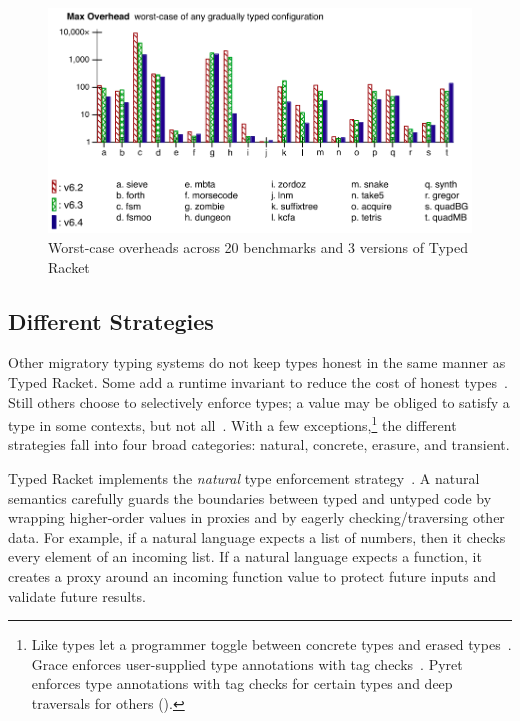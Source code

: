 \begin{figure}[h]
  \includegraphics[width=0.8\columnwidth]{src/jfp-2019-max.png}
  \caption{Worst-case overheads across 20 benchmarks and 3 versions of Typed Racket~\cite{gtnffvf-jfp-2019}}
  \label{fig:max-overhead}
\end{figure}


\subsection{Different Strategies}

Other migratory typing systems do not keep types honest in the
 same manner as Typed Racket.
Some add a runtime invariant to reduce the cost of honest types~\cite{wnlov-popl-2010,bmt-ecoop-2010,mt-oopsla-2017}.
Still others choose to selectively enforce types; a value may be obliged to
 satisfy a type in some contexts, but not all~\cite{vss-popl-2017}.
With a few exceptions,\footnote{Like types
 let a programmer toggle between concrete types and erased types~\cite{wnlov-popl-2010,rzv-ecoop-2015}.
 Grace enforces user-supplied type annotations with tag checks~\cite{rmhn-ecoop-2019}.
 Pyret enforces type annotations with tag checks
  for certain types and deep traversals for others ().}
 the different strategies fall into four broad categories:
 natural, concrete, erasure, and transient.

Typed Racket implements the \emph{natural}\/ type enforcement
 strategy~\cite{mf-toplas-2009,tf-popl-2008}.
A natural semantics carefully guards the boundaries between typed and untyped
 code by wrapping higher-order values in proxies and by eagerly
 checking/traversing other data.
For example, if a natural language expects a list of numbers, then it
 checks every element of an incoming list.
If a natural language expects a function, it creates a proxy around an incoming
 function value to protect future inputs and validate future results.

